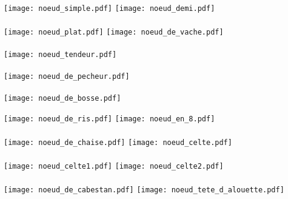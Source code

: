 \documentclass{livret}
\begin{document}
\texttt{[image: noeud\_simple.pdf]} \hfill \texttt{[image: noeud\_demi.pdf]}\\
\\
\texttt{[image: noeud\_plat.pdf]} \hfill \texttt{[image: noeud\_de\_vache.pdf]}\\
\\
\texttt{[image: noeud\_tendeur.pdf]}\\
\\
\texttt{[image: noeud\_de\_pecheur.pdf]}\\
\\
\texttt{[image: noeud\_de\_bosse.pdf]}\\

\newpage

\texttt{[image: noeud\_de\_ris.pdf]} \hfill \texttt{[image: noeud\_en\_8.pdf]}\\
\\
\texttt{[image: noeud\_de\_chaise.pdf]} \hfill \texttt{[image: noeud\_celte.pdf]}\\
\\
\texttt{[image: noeud\_celte1.pdf]} \hfill \texttt{[image: noeud\_celte2.pdf]}\\
\\
\texttt{[image: noeud\_de\_cabestan.pdf]} \hfill \texttt{[image: noeud\_tete\_d\_alouette.pdf]}\\
\end{document}
